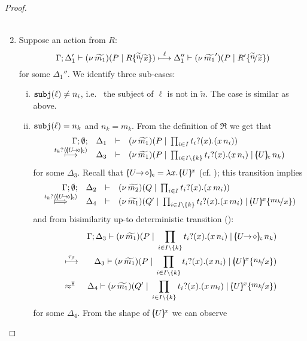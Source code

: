 \begin{proof}
\begin{enumerate}
\begin{eqnarray*}
				\end{eqnarray*}
		\item	Suppose an action from $R$:
		\[
					\horel{\Gamma}{\Delta_1'}{\newsp{\widetilde{m_1}}{P \Par R \subst{\widetilde{n}}{\widetilde{x}}  }}
					{\hby{\ell}}
					{\Delta_1''}{\newsp{\widetilde{m_1}'}{P \Par R' \subst{\widetilde{n}}{\widetilde{x}} }}
				\]
				for some $\Delta_1''$.
				We identify three sub-cases:
				\begin{enumerate}[i.]
					\item	$\mathtt{subj}(\ell) \not= n_i$, i.e.~ the subject of $\ell$ is not in $\widetilde{n}$. The case is similar as above.

					\item	$\mathtt{subj}(\ell) = n_k$ and $n_k = m_k$.
							From the definition of $\Re$ we get that
							\[
								\mhorel{\Gamma}{\Delta_1}{\newsp{\widetilde{m_1}}{P \Par \prod_{i \in I} \binp{t_i}{x} (\appl{x}{n_i})}}
								{\hby{ \bactinp{t_k}{\omapchar{\shot{U}}}}}
								{\Delta_3}{}{\newsp{\widetilde{m_1}}{P \Par \prod_{i \in I\backslash{\set{k}}} \binp{t_i}{x} (\appl{x}{n_i}) \Par \appl{\omapchar{U}}{n_k}}}
							\]
							for some $\Delta_3$. 
							Recall that $\omapchar{\shot{U}} = \abs{x}{\mapchar{U}{x}}$ (cf. ); 
							this transition implies
							\[
								\mhorel{\Gamma}{\Delta_2}{\newsp{\widetilde{m_2}}{Q \Par \prod_{i \in I} \binp{t_i}{x} (\appl{x}{m_i})}}
								{\Hby{ \bactinp{t_k}{\omapchar{\shot{U}}}}}
								{\Delta_4}{}{\newsp{\widetilde{m_1}}{Q' \Par \prod_{i \in I \backslash{\set{k}}} \binp{t_i}{x} (\appl{x}{m_i}) \Par \mapchar{U}{x} \subst{m_k}{x} }}
							\]
							and from bisimilarity up-to deterministic transition ():
							\begin{eqnarray*}
								&& \Gamma; \Delta_3 \proves \newsp{\widetilde{m_1}}{P \Par \prod_{i \in I \backslash{\set{k}}} \binp{t_i}{x} (\appl{x}{n_i}) \Par \appl{\omapchar{\shot{U}}}{n_k}}
								\\
								&\hby{\tau_{\beta}}&
									\Delta_3 \proves \newsp{\widetilde{m_1}}{P \Par \prod_{i \in I \backslash{\set{k}}} \binp{t_i}{x} (\appl{x}{n_i}) \Par \mapchar{U}{x} \subst{n_k}{x}  }
								\\
								&\hwb&
									\Delta_4 \proves \newsp{\widetilde{m_1}}{Q' \Par \prod_{i \in I \backslash{\set{k}}} \binp{t_i}{x} (\appl{x}{m_i}) \Par \mapchar{U}{x} \subst{m_k}{x}}
							\end{eqnarray*}
for some $\Delta_4$.
							From the shape of $[\!\!(U)\!\!]^{x}$ we can observe

\end{enumerate}
\end{enumerate}
\end{proof}
